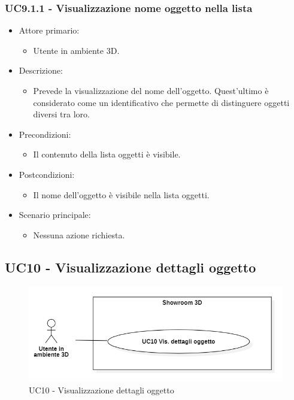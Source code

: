 \subsubsection{UC9.1.1 - Visualizzazione nome oggetto nella lista}
\begin{itemize}

	\item Attore primario: 
	\begin{itemize}
		\item Utente in ambiente 3D.
	\end{itemize}
	\item Descrizione:
	\begin{itemize}
		\item Prevede la visualizzazione del nome dell’oggetto. Quest'ultimo è considerato come un identificativo che permette di distinguere oggetti diversi tra loro.
	\end{itemize}
	
	\item Precondizioni:
	\begin{itemize}
		\item Il contenuto della lista oggetti è visibile.
	\end{itemize}
	
	\item Postcondizioni:
	\begin{itemize}
		\item Il nome dell'oggetto è visibile nella lista oggetti.
	\end{itemize}
	
	\item Scenario principale:
	\begin{itemize}
		\item Nessuna azione richiesta.
	\end{itemize}
	
\end{itemize}

\pagebreak

\subsection{UC10 - Visualizzazione dettagli oggetto}

\begin{figure}[H]
  \renewcommand{\thefigure}{7}
  \includegraphics[width=\linewidth]{./res/images/UC10.png}
  \caption{UC10 - Visualizzazione dettagli oggetto}
  \label{fig:UC 10}
\end{figure}

